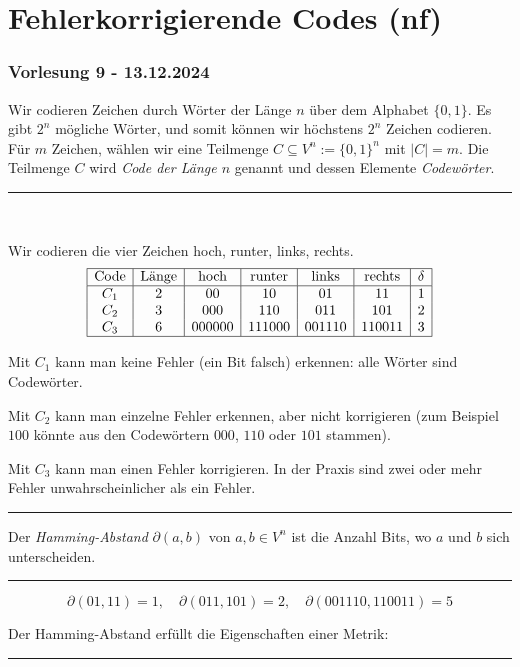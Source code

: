 \documentclass[9pt]{article}
\begin{document}
\section{Fehlerkorrigierende Codes (nf)}
\subsubsection*{Vorlesung 9 - 13.12.2024}
Wir codieren Zeichen durch Wörter der Länge \( n \) über dem Alphabet \(\{0, 1\}\).
Es gibt \(2^n\) mögliche Wörter, und somit können wir höchstens \(2^n\) Zeichen
codieren. Für \(m\) Zeichen, wählen wir eine Teilmenge \(C \subseteq V^n := \{0, 1\}^n\)
mit \(|C| = m\). Die Teilmenge \(C\) wird \emph{Code der Länge \(n\)} genannt und dessen
Elemente \emph{Codewörter}. \\
 \noindent \rule{8cm}{0.4pt} \\
\begin{bsp}
Wir codieren die vier Zeichen hoch, runter, links, rechts.
\[
\begin{array}{|c|c|c|c|c|c|c|}
\hline
\text{Code} & \text{Länge} & \text{hoch} & \text{runter} & \text{links} & \text{rechts} & \delta  \\
\hline
C_1 & 2 & 00 & 10 & 01 & 11 & 1 \\
C_2 & 3 & 000 & 110 & 011 & 101 & 2 \\
C_3 & 6 & 000000 & 111000 & 001110 & 110011 & 3 \\
\hline
\end{array}
\]

Mit \(C_1\) kann man keine Fehler (ein Bit falsch) erkennen: alle Wörter sind
Codewörter.

Mit \(C_2\) kann man einzelne Fehler erkennen, aber nicht korrigieren (zum
Beispiel \(100\) könnte aus den Codewörtern \(000\), \(110\) oder \(101\) stammen).

Mit \(C_3\) kann man einen Fehler korrigieren. In der Praxis sind zwei oder
mehr Fehler unwahrscheinlicher als ein Fehler.
\end{bsp} \noindent \rule{8cm}{0.4pt}

\begin{defi}
Der \emph{Hamming-Abstand} \(\partial(a, b)\) von \(a, b \in V^n\) ist die Anzahl
Bits, wo \(a\) und \(b\) sich unterscheiden.
\end{defi} \noindent \rule{8cm}{0.4pt}

\begin{bsp}
\[
\partial(01, 11) = 1, \quad \partial(011, 101) = 2, \quad \partial(001110, 110011) = 5
\]

Der Hamming-Abstand erfüllt die Eigenschaften einer Metrik:
\end{bsp} \noindent \rule{8cm}{0.4pt}
\end{document}
